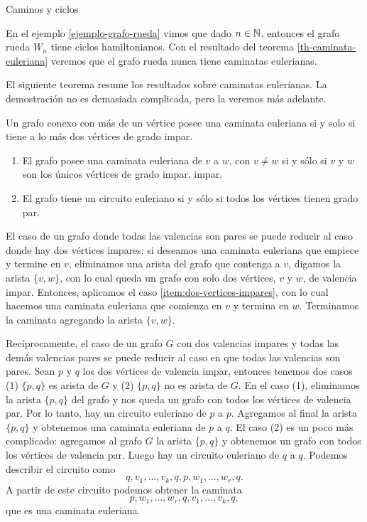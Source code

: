 \begin{section}{Caminos y ciclos}
\begin{ejemplo*}
    En  el ejemplo \ref{ejemplo-grafo-rueda} vimos que dado $n \in {\mathbb N}$, entonces el grafo rueda $W_n$ tiene ciclos hamiltonianos. Con el resultado del teorema \ref{th-caminata-euleriana} veremos que  el grafo rueda nunca tiene caminatas eulerianas. 
\end{ejemplo*}

El siguiente teorema resume los resultados sobre caminatas eulerianas. La demostración no es demasiada complicada, pero la veremos más adelante.  

\begin{teorema}\label{th-caminata-euleriana} Un grafo conexo con más de un vértice posee una caminata euleriana si y solo si tiene a lo más dos vértices de grado impar. 
\begin{enumerate}
    \item\label{item:dos-vertices-impares} El grafo posee una caminata  euleriana de $v$ a $w$, con $v \not= w$ si y sólo si $v$ y $w$ son los únicos vértices de grado impar.
    impar.
    \item\label{item:todos-los-vertices-pares} El grafo tiene un circuito euleriano si y sólo si todos los vértices tienen grado par.
\end{enumerate}
\end{teorema}

\begin{observacion}\label{obs-par-a-impar}
    El caso de un grafo donde todas las valencias son pares se puede reducir al caso donde hay dos vértices impares: si deseamos una caminata euleriana que empiece y termine en $v$, eliminamos una arista del grafo que contenga a $v$, digamos la arista $\{v,w\}$, con lo cual queda un grafo  con solo dos vértices, $v$ y $w$, de valencia impar. Entonces, aplicamos el caso  \ref{item:dos-vertices-impares}, con lo cual hacemos una caminata euleriana que comienza en $v$ y  termina en  $w$. Terminamos la caminata agregando  la arista $\{v,w\}$. 
\end{observacion}

\begin{observacion}\label{obs-impar-a-par}
    Recíprocamente,  el caso de un grafo  $G$ con dos valencias impares y todas las demás valencias pares  se puede reducir al caso en que todas las valencias son pares. Sean $p$ y $q$ los dos vértices de valencia impar,  entonces tenemos dos casos (1) $\{p,q\}$  es arista de $G$ y (2) $\{p,q\}$  no es arista de $G$.  En el caso (1),  eliminamos la arista  $\{p,q\}$  del grafo  y  nos queda un grafo  con todos los vértices de valencia par. Por lo tanto, hay un circuito euleriano de $p$  a $p$. Agregamos al final la arista $\{p,q\}$  y obtenemos una caminata euleriana de  $p$ a $q$. El caso (2) es un poco más complicado: agregamos al grafo $G$ la arista $\{p,q\}$ y obtenemos un grafo  con todos los vértices de valencia par. Luego  hay un circuito euleriano de $q$ a $q$. Podemos describir el circuito como
    $$
    q,v_1,\ldots,v_k,q,p,w_1,\ldots,w_r,q.
    $$
    A partir de este circuito podemos obtener la caminata
    $$
    p,w_1,\ldots,w_r,q,v_1,\ldots,v_k,q, 
    $$
    que es una caminata euleriana. 
\end{observacion}


\end{section}
